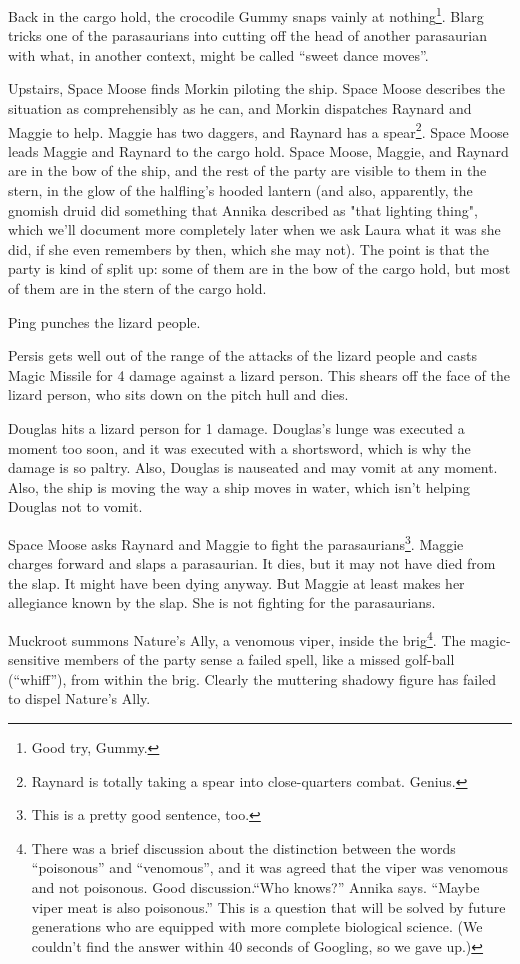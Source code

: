 \documentclass{article}
\begin{document}
Back in the cargo hold, the crocodile Gummy snaps vainly at nothing\footnote{Good try, Gummy.}. Blarg tricks one of the parasaurians into cutting off the head of another parasaurian with what, in another context, might be called ``sweet dance moves''.

Upstairs, Space Moose finds Morkin piloting the ship. Space Moose describes the situation as comprehensibly as he can, and Morkin dispatches Raynard and Maggie to help. Maggie has two daggers, and Raynard has a spear\footnote{Raynard is totally taking a spear into close-quarters combat. Genius.}. Space Moose leads Maggie and Raynard to the cargo hold. Space Moose, Maggie, and Raynard are in the bow of the ship, and the rest of the party are visible to them in the stern, in the glow of the halfling's hooded lantern (and also, apparently, the gnomish druid did something that Annika described as "that lighting thing", which we'll document more completely later when we ask Laura what it was she did, if she even remembers by then, which she may not). The point is that the party is kind of split up: some of them are in the bow of the cargo hold, but most of them are in the stern of the cargo hold.

Ping punches the lizard people.

Persis gets well out of the range of the attacks of the lizard people and casts Magic Missile for 4 damage against a lizard person. This shears off the face of the lizard person, who sits down on the pitch hull and dies.

Douglas hits a lizard person for 1 damage. Douglas's lunge was executed a moment too soon, and it was executed with a shortsword, which is why the damage is so paltry. Also, Douglas is nauseated and may vomit at any moment. Also, the ship is moving the way a ship moves in water, which isn't helping Douglas not to vomit.

Space Moose asks Raynard and Maggie to fight the parasaurians\footnote{This is a pretty good sentence, too.}. Maggie charges forward and slaps a parasaurian. It dies, but it may not have died from the slap. It might have been dying anyway. But Maggie at least makes her allegiance known by the slap. She is not fighting for the parasaurians.

Muckroot summons Nature's Ally, a venomous viper, inside the brig\footnote{There was a brief discussion about the distinction between the words ``poisonous'' and ``venomous'', and it was agreed that the viper was venomous and not poisonous. Good discussion.``Who knows?'' Annika says. ``Maybe viper meat is also poisonous.'' This is a question that will be solved by future generations who are equipped with more complete biological science. (We couldn't find the answer within 40 seconds of Googling, so we gave up.)}. The magic-sensitive members of the party sense a failed spell, like a missed golf-ball (``whiff''), from within the brig. Clearly the muttering shadowy figure has failed to dispel Nature's Ally.
\end{document}
